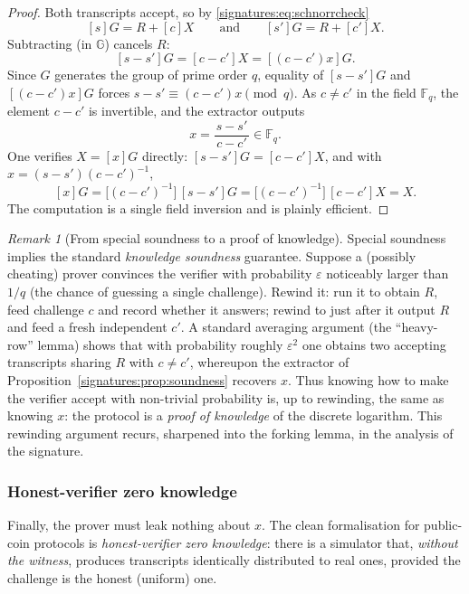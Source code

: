 \documentclass[11pt,a4paper]{article}
\theoremstyle{definition}
\theoremstyle{remark}
\newtheorem{remark}[theorem]{Remark}
\newcommand{\G}{\ensuremath{\mathbb{G}}}
\newcommand{\Fq}{\ensuremath{\mathbb{F}_{q}}}
\begin{document}
\begin{proof}
Both transcripts accept, so by \eqref{signatures:eq:schnorrcheck}
\[
  [s]G = R + [c]X
  \qquad\text{and}\qquad
  [s']G = R + [c']X.
\]
Subtracting (in \(\G\)) cancels \(R\):
\[
  [s - s']G = [c - c']X = [(c - c')x]G.
\]
Since \(G\) generates the group of prime order \(q\), equality of \([s-s']G\) and \([(c-c')x]G\) forces \(s - s' \equiv (c - c')x \pmod q\). As \(c \ne c'\) in the field \(\Fq\), the element \(c - c'\) is invertible, and the extractor outputs
\[
  x = \frac{s - s'}{\,c - c'\,} \in \Fq.
\]
One verifies \(X = [x]G\) directly: \([s - s']G = [c - c']X\), and with \(x = (s - s')(c - c')^{-1}\),
\[
  [x]G = \bigl[(c - c')^{-1}\bigr]\,[s - s']G = \bigl[(c - c')^{-1}\bigr]\,[c - c']X = X.
\]
The computation is a single field inversion and is plainly efficient.
\end{proof}

\begin{remark}[From special soundness to a proof of knowledge]\label{signatures:rem:pok}
Special soundness implies the standard \emph{knowledge soundness} guarantee. Suppose a (possibly cheating) prover convinces the verifier with probability \(\varepsilon\) noticeably larger than \(1/q\) (the chance of guessing a single challenge). Rewind it: run it to obtain \(R\), feed challenge \(c\) and record whether it answers; rewind to just after it output \(R\) and feed a fresh independent \(c'\). A standard averaging argument (the ``heavy-row'' lemma) shows that with probability roughly \(\varepsilon^2\) one obtains two accepting transcripts sharing \(R\) with \(c \ne c'\), whereupon the extractor of Proposition~\ref{signatures:prop:soundness} recovers \(x\). Thus knowing how to make the verifier accept with non-trivial probability is, up to rewinding, the same as knowing \(x\): the protocol is a \emph{proof of knowledge} of the discrete logarithm. This rewinding argument recurs, sharpened into the forking lemma, in the analysis of the signature.
\end{remark}

\subsubsection{Honest-verifier zero knowledge}\label{signatures:subsubsec:hvzk}

Finally, the prover must leak nothing about \(x\). The clean formalisation for public-coin protocols is \emph{honest-verifier zero knowledge}: there is a simulator that, \emph{without the witness}, produces transcripts identically distributed to real ones, provided the challenge is the honest (uniform) one.
\end{document}
